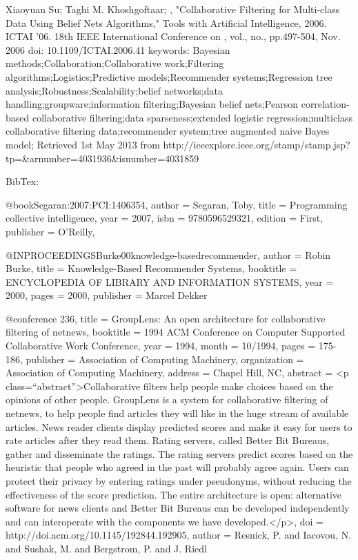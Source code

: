 \begin{thebibliography}{9}
Xiaoyuan Su; Taghi M. Khoshgoftaar; , "Collaborative Filtering for Multi-class Data Using Belief Nets Algorithms," Tools with Artificial Intelligence, 2006. ICTAI '06. 18th IEEE International Conference on , vol., no., pp.497-504, Nov. 2006
doi: 10.1109/ICTAI.2006.41
keywords: {Bayesian methods;Collaboration;Collaborative work;Filtering algorithms;Logistics;Predictive models;Recommender systems;Regression tree analysis;Robustness;Scalability;belief networks;data handling;groupware;information filtering;Bayesian belief nets;Pearson correlation-based collaborative filtering;data sparseness;extended logistic regression;multiclass collaborative filtering data;recommender system;tree augmented naive Bayes model;}
Retrieved 1st May 2013 from http://ieeexplore.ieee.org/stamp/stamp.jsp?tp=&arnumber=4031936&isnumber=4031859



BibTex:

@book{Segaran:2007:PCI:1406354,
author = {Segaran, Toby},
title = {Programming collective intelligence},
year = {2007},
isbn = {9780596529321},
edition = {First},
publisher = {O'Reilly},
} 


@INPROCEEDINGS{Burke00knowledge-basedrecommender,
author = {Robin Burke},
title = {Knowledge-Based Recommender Systems},
booktitle = {ENCYCLOPEDIA OF LIBRARY AND INFORMATION SYSTEMS},
year = {2000},
pages = {2000},
publisher = {Marcel Dekker}
}

@conference {236,
title = {GroupLens: An open architecture for collaborative filtering of netnews},
booktitle = {1994 ACM Conference on Computer Supported Collaborative Work Conference},
year = {1994},
month = {10/1994},
pages = {175-186},
publisher = {Association of Computing Machinery},
organization = {Association of Computing Machinery},
address = {Chapel Hill, NC},
abstract = {<p class=``abstract''>Collaborative filters help people make choices based on the opinions of other people. GroupLens is a system for collaborative filtering of netnews, to help people find articles they will like in the huge stream of available articles. News reader clients display predicted scores and make it easy for users to rate articles after they read them. Rating servers, called Better Bit Bureaus, gather and disseminate the ratings. The rating servers predict scores based on the heuristic that people who agreed in the past will probably agree again. Users can protect their privacy by entering ratings under pseudonyms, without reducing the effectiveness of the score prediction. The entire architecture is open: alternative software for news clients and Better Bit Bureaus can be developed independently and can interoperate with the components we have developed.</p>},
doi = {http://doi.acm.org/10.1145/192844.192905},
author = {Resnick, P. and Iacovou, N. and Sushak, M. and Bergstrom, P. and J. Riedl}
}


\fi

\end{thebibliography}

